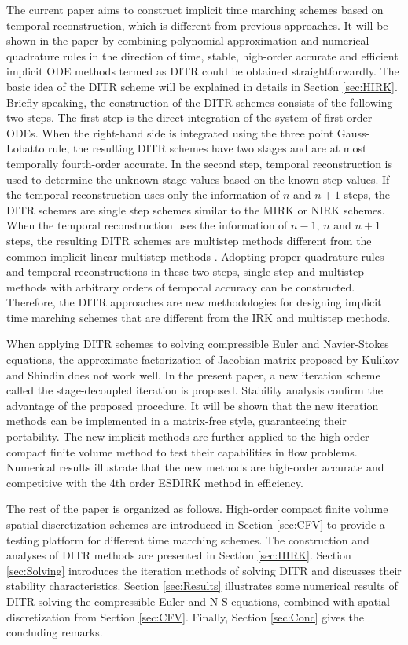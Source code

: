 The current paper aims to construct implicit
time marching schemes based on temporal
reconstruction, which is different from previous approaches.
It will be shown in the paper by combining polynomial approximation and
numerical quadrature rules in the direction of time,
stable,
high-order accurate and efficient implicit ODE methods
termed as DITR could be
obtained straightforwardly.
The basic idea of the DITR scheme will be explained in details
in Section \ref{sec:HIRK}.
Briefly speaking, the construction of the DITR
schemes consists of the following two steps.
The first step is the direct integration of the
system of first-order ODEs.
When the right-hand side is integrated using the
three point Gauss-Lobatto rule, the resulting DITR
schemes have two stages and are at most temporally fourth-order accurate.
In the second step, temporal reconstruction is used to determine the
unknown stage values based on the known step values.
If the temporal reconstruction uses only the information of $n$
and $n+1$ steps, the DITR schemes are single step schemes
similar to the MIRK or NIRK schemes.
When the temporal reconstruction uses the information of $n-1$, $n$ and $n+1$ steps,
the resulting DITR schemes are multistep methods
different from the common implicit linear multistep
methods \cite{wanner1996solving}.
Adopting proper quadrature rules
and temporal reconstructions in these two steps, single-step
and multistep methods with arbitrary orders of temporal
accuracy can be constructed. Therefore, the DITR approaches
are new methodologies for designing implicit time marching
schemes that are different from the IRK and multistep
methods.

When applying DITR schemes to solving compressible Euler and
Navier-Stokes equations, the approximate factorization of Jacobian matrix
proposed by Kulikov and Shindin \cite{kulikov2007asymptotic}
does not work well.
In the present paper,
a new iteration scheme called the stage-decoupled iteration
is proposed.
Stability analysis
confirm the advantage of the proposed procedure.
It will be shown that the new iteration methods can be implemented
in a matrix-free style, guaranteeing their portability.
The new implicit methods are further applied to the
high-order compact finite volume method \cite{wang2017compact_VR} to
test their capabilities in flow problems. Numerical results
illustrate that the new methods are high-order accurate
and competitive with the 4th order ESDIRK method in efficiency.

The rest of the paper is organized as follows.
High-order compact finite volume spatial discretization schemes
are introduced in Section \ref{sec:CFV} to provide a testing platform for
different time marching schemes.
The construction and analyses of DITR methods are presented
in Section \ref{sec:HIRK}.
Section \ref{sec:Solving} introduces the iteration methods
of solving DITR and discusses their stability characteristics.
Section \ref{sec:Results} illustrates some numerical results of
DITR solving the compressible Euler and N-S equations, combined with
spatial discretization from Section \ref{sec:CFV}.
Finally, Section \ref{sec:Conc} gives the concluding remarks.


